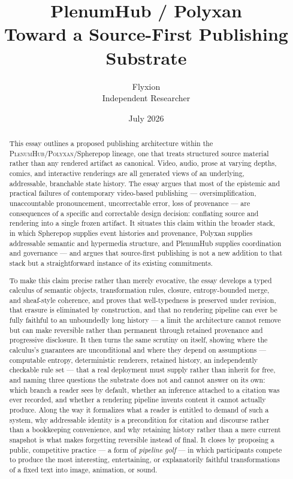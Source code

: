 \documentclass[11pt]{article}
\title{\textbf{PlenumHub / Polyxan}\\
\large Toward a Source-First Publishing Substrate}
\author{Flyxion\\\small Independent Researcher}
\date{July 2026}
\theoremstyle{definition}
\begin{document}
\maketitle

\begin{abstract}
\noindent This essay outlines a proposed publishing architecture within the \textsc{PlenumHub}\slash\textsc{Polyxan}\slash Spherepop lineage, one that treats structured source material rather than any rendered artifact as canonical. Video, audio, prose at varying depths, comics, and interactive renderings are all generated views of an underlying, addressable, branchable state history. The essay argues that most of the epistemic and practical failures of contemporary video-based publishing --- oversimplification, unaccountable pronouncement, uncorrectable error, loss of provenance --- are consequences of a specific and correctable design decision: conflating source and rendering into a single frozen artifact. It situates this claim within the broader stack, in which Spherepop supplies event histories and provenance, Polyxan supplies addressable semantic and hypermedia structure, and PlenumHub supplies coordination and governance --- and argues that source-first publishing is not a new addition to that stack but a straightforward instance of its existing commitments.

To make this claim precise rather than merely evocative, the essay develops a typed calculus of semantic objects, transformation rules, closure, entropy-bounded merge, and sheaf-style coherence, and proves that well-typedness is preserved under revision, that erasure is eliminated by construction, and that no rendering pipeline can ever be fully faithful to an unboundedly long history --- a limit the architecture cannot remove but can make reversible rather than permanent through retained provenance and progressive disclosure. It then turns the same scrutiny on itself, showing where the calculus's guarantees are unconditional and where they depend on assumptions --- computable entropy, deterministic renderers, retained history, an independently checkable rule set --- that a real deployment must supply rather than inherit for free, and naming three questions the substrate does not and cannot answer on its own: which branch a reader sees by default, whether an inference attached to a citation was ever recorded, and whether a rendering pipeline invents content it cannot actually produce. Along the way it formalizes what a reader is entitled to demand of such a system, why addressable identity is a precondition for citation and discourse rather than a bookkeeping convenience, and why retaining history rather than a mere current snapshot is what makes forgetting reversible instead of final. It closes by proposing a public, competitive practice --- a form of \emph{pipeline golf} --- in which participants compete to produce the most interesting, entertaining, or explanatorily faithful transformations of a fixed text into image, animation, or sound.
\end{abstract}
\end{document}
